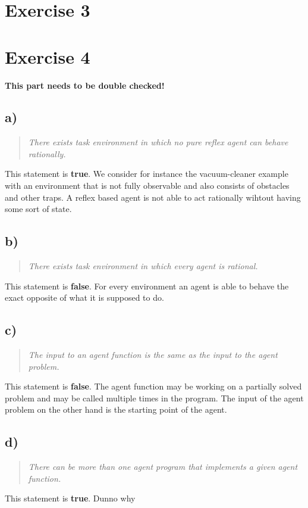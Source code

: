 \documentclass[11pt]{article}
\begin{document}
\newpage

\section*{Exercise 3}

\newpage
\section*{Exercise 4}
\textbf{This part needs to be double checked!}
\subsection*{a)}
\begin{quotation}\noindent
\textit{There exists task environment in which no pure reflex agent can behave rationally.}
\end{quotation}
\noindent
This statement is \textbf{true}. We consider for instance the vacuum-cleaner example with an environment that is not fully observable and also consists of obstacles and other traps. A reflex based agent is not able to act rationally wihtout having some sort of state.

\subsection*{b)}
\begin{quotation}\noindent
\textit{There exists task environment in which every agent is rational.}
\end{quotation}
\noindent
This statement is \textbf{false}. For every environment an agent is able to behave the exact opposite of what it is supposed to do.

\subsection*{c)}
\begin{quotation}\noindent
\textit{The input to an agent function is the same as the input to the agent problem.}
\end{quotation}
\noindent
This statement is \textbf{false}. The agent function may be working on a partially solved problem and may be called multiple times in the program. The input of the agent problem on the other hand is the starting point of the agent.

\subsection*{d)}
\begin{quotation}\noindent
\textit{There can be more than one agent program that implements a given agent function.}
\end{quotation}
\noindent
This statement is \textbf{true}. Dunno why
\end{document}

